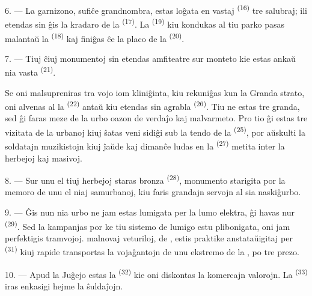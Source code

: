 \VUsaut{5.0mm}
\VUsaut{3.4mm}

6. --- La garnizono, sufiĉe grandnombra, estas loĝata en vastaj
 \textsuperscript{(16)} tre salubraj; ili etendas sin ĝis la
kradaro de la  \textsuperscript{(17)}. La
 \textsuperscript{(19)} kiu kondukas al tiu parko pasas
malantaŭ la  \textsuperscript{(18)} kaj finiĝas ĉe la placo
de la  \textsuperscript{(20)}.

7. --- Tiuj ĉiuj monumentoj sin etendas amfiteatre sur monteto kie estas ankaŭ
nia vasta  \textsuperscript{(21)}.

Se oni malsupreniras tra vojo iom kliniĝinta, kiu rekuniĝas kun la Granda
strato, oni alvenas al la  \textsuperscript{(22)} antaŭ kiu
etendas sin agrabla  \textsuperscript{(26)}. Tiu
 ne estas tre granda, sed ĝi faras meze de la urbo oazon de
verdaĵo kaj malvarmeto. Pro tio ĝi estas tre vizitata de la urbanoj kiuj ŝatas
veni sidiĝi sub la tendo de la  \textsuperscript{(25)}, por
aŭskulti la soldatajn muzikistojn kiuj ĵaŭde kaj dimanĉe ludas en la
 \textsuperscript{(27)} metita inter la herbejoj kaj masivoj.

8. --- Sur unu el tiuj herbejoj staras bronza 
\textsuperscript{(28)}, monumento starigita por la memoro de unu el niaj
samurbanoj, kiu faris grandajn servojn al sia naskiĝurbo.

\VUsaut{4.0mm}
\VUsaut{3.4mm}

9. --- Ĝis nun nia urbo ne jam estas lumigata per la lumo elektra, ĝi havas nur
 \textsuperscript{(29)}. Sed la 
kampanjas por ke tiu sistemo de lumigo estu plibonigata,  oni jam
perfektigis  tramvojoj. 
malnovaj veturiloj,  de , estis praktike
anstataŭigitaj per  \textsuperscript{(31)} kiuj
rapide transportas la vojaĝantojn de unu ekstremo de la , po tre  prezo.

10. --- Apud la Juĝejo estas la  \textsuperscript{(32)} kie oni
diskontas la komercajn valorojn. La 
\textsuperscript{(33)} iras enkasigi hejme la ŝuldaĵojn.

